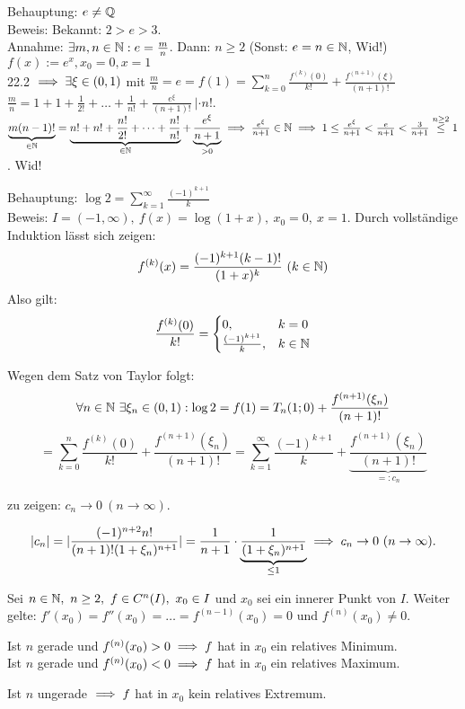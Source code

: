 \documentclass[a4paper,twoside,DIV15,BCOR12mm]{scrbook}
\begin{document}
\begin{beispiele}
\item Behauptung: $e \ne \mathbb{Q}$ \\
Beweis: Bekannt: $2>e>3$. \\
Annahme: $\exists m,n\in\mathbb{N}: e=\frac{m}{n}$. Dann: $n\ge 2$ (Sonst: $e=n\in\mathbb{N}$, Wid!)\
$f(x):= e^x, x_0 = 0, x=1$ \\
22.2 $\implies \exists \xi \in (0,1)$ mit $\frac{m}{n}=e=f(1)=\sum_{k=0}^n\frac{f^{(k)}(0)}{k!} + \frac{f^{(n+1)}(\xi)}{(n+1)!}$\\
$\frac{m}{n} = 1 + 1+ \frac{1}{2!} + \ldots + \frac{1}{n!} + \frac{e^\xi}{(n+1)!}\  | \cdot n!$. \\
$\underbrace{m(n-1)!}_{\in\mathbb{N}} = \underbrace{n! + n! + \frac{n!}{2!} + \cdots + \frac{n!}{n!}}_{\in \mathbb{N}} + \underbrace{\frac{e^\xi}{n+1}}_{>0} \implies \frac{e^\xi}{n+1} \in \mathbb{N} \implies 1 \le \frac{e^\xi}{n+1} < \frac{e}{n+1} < \frac{3}{n+1} \stackrel{n\ge2}{\le} 1$. Wid!
\item Behauptung: $\log 2 = \sum_{k=1}^{\infty}{\frac{(-1)^{k+1}}{k}}$\\
Beweis: $I = (-1,\infty),\ f(x) = \log(1+x),\ x_0=0,\ x=1.$ Durch vollständige Induktion lässt sich zeigen:
$$f^{(k)}(x) = \frac{(-1)^{k+1}(k-1)!}{(1+x)^k}\ (k\in\MdN)$$
Also gilt:
$$\frac{f^{(k)}(0)}{k!} = \begin{cases}
0,&k=0\\
\frac{(-1)^{k+1}}{k},&k\in\mathbb{N}
\end{cases}$$

Wegen dem Satz von Taylor folgt:
$$\forall n\in\mathbb{N}\ \exists \xi_n\in(0,1): \log 2 = f(1) = T_n(1;0) + \frac{f^{(n+1)}(\xi_n)}{(n+1)!}$$
$$= \sum_{k=0}^{n}{\frac{f^{(k)}(0)}{k!}} + \frac{f^{(n+1)}(\xi_n)}{(n+1)!} = \sum_{k=1}^{\infty}{\frac{(-1)^{k+1}}{k}} + \underbrace{\frac{f^{(n+1)}(\xi_n)}{(n+1)!}}_{=:c_n}$$

zu zeigen: $c_n \to 0\ (n \to \infty).$

$$|c_n| = |\frac{(-1)^{n+2}n!}{(n+1)!(1+\xi_n)^{n+1}}| = \frac{1}{n+1} \cdot \underbrace{\frac{1}{(1+\xi_n)^{n+1}}}_{\le 1} \implies c_n \to 0\ (n \to \infty).$$
\end{beispiele}

\begin{satz}
Sei $n \in \MdN,\ n \ge 2,\ f \in C^n(I),\ x_0 \in I$ und $x_0$ sei ein innerer Punkt von $I$. Weiter gelte: $f'(x_0) = f''(x_0) = \ldots = f^{(n-1)}(x_0) = 0$ und $f^{(n)}(x_0) \ne 0.$
\begin{liste}
\item Ist $n$ gerade und $f^{(n)}(x_0) > 0 \implies f$ hat in $x_0$ ein relatives Minimum.\\
Ist $n$ gerade und $f^{(n)}(x_0) < 0 \implies f$ hat in $x_0$ ein relatives Maximum.
\item Ist $n$ ungerade $\implies f$ hat in $x_0$ kein relatives Extremum.
\end{liste}
\end{satz}
\end{document}
